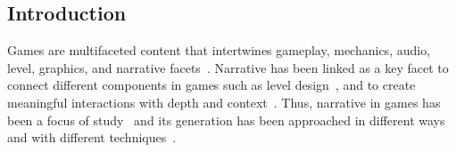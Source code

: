 \subsection{Introduction}






Games are multifaceted content that intertwines gameplay, mechanics, audio, level, graphics, and narrative facets~. Narrative has been linked as a key facet to connect different components in games such as level design~, and to create meaningful interactions with depth and context~. Thus, narrative in games has been a focus of study~ and its generation has been approached in different ways and with different techniques~.

